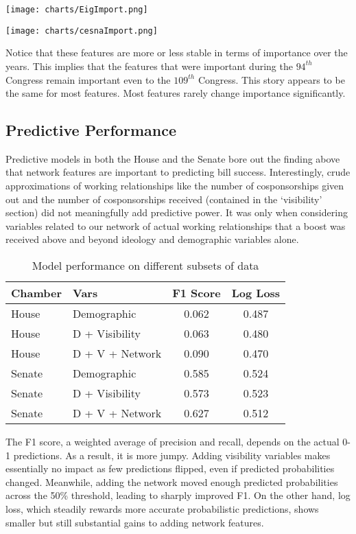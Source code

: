 \texttt{[image: charts/EigImport.png]}

\texttt{[image: charts/cesnaImport.png]}

Notice that these features are more or less stable in terms of importance over
the years. This implies that the features that were important during the
$94^{th}$ Congress remain important even to the $109^{th}$ Congress. This story
appears to be the same for most features. Most features rarely change importance
significantly.

\subsection{Predictive Performance}

Predictive models in both the House and the Senate bore out the finding above that network features are important to predicting bill success. Interestingly, crude approximations of working relationships like the number of cosponsorships given out and the number of cosponsorships received (contained in the `visibility' section) did not meaningfully add predictive power. It was only when considering variables related to our network of actual working relationships that a boost was received above and beyond ideology and demographic variables alone.

\begin{table}
\centering
   \begin{tabular}{llcc}
   \toprule
   Chamber & Vars & F1 Score & Log Loss \\ \midrule
   House & Demographic & 0.062 & 0.487 \\
   House & D + Visibility & 0.063 & 0.480 \\
   House & D + V + Network & 0.090 & 0.470 \\
   Senate & Demographic & 0.585 & 0.524 \\
   Senate & D + Visibility & 0.573 & 0.523 \\ 
   Senate & D + V + Network & 0.627 & 0.512 \\ \bottomrule
   \end{tabular}
   \caption{Model performance on different subsets of data}
   \label{table:perf}
\end{table}

The F1 score, a weighted average of precision and recall, depends on the actual 0-1 predictions. As a result, it is more jumpy. Adding visibility variables makes essentially no impact as few predictions flipped, even if predicted probabilities changed. Meanwhile, adding the network moved enough predicted probabilities across the 50\% threshold, leading to sharply improved F1. On the other hand, log loss, which steadily rewards more accurate probabilistic predictions, shows smaller but still substantial gains to adding network features.
